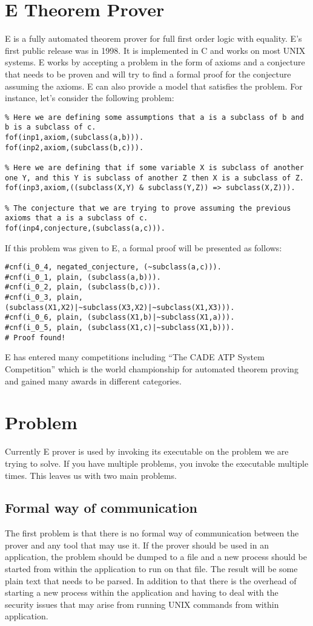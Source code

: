 \section{E Theorem Prover}
E is a fully automated theorem prover for full first order logic with equality. E's first public release was in 1998. It is implemented in C and works on most UNIX systems. E works by accepting a problem in the form of axioms and a conjecture that needs to be proven and will try to find a formal proof for the conjecture assuming the axioms. E can also provide a model that satisfies the problem. For instance, let's consider the following problem:
\begin{lstlisting}
% Here we are defining some assumptions that a is a subclass of b and b is a subclass of c.
fof(inp1,axiom,(subclass(a,b))).
fof(inp2,axiom,(subclass(b,c))).

% Here we are defining that if some variable X is subclass of another one Y, and this Y is subclass of another Z then X is a subclass of Z.
fof(inp3,axiom,((subclass(X,Y) & subclass(Y,Z)) => subclass(X,Z))).

% The conjecture that we are trying to prove assuming the previous axioms that a is a subclass of c.
fof(inp4,conjecture,(subclass(a,c))).
\end{lstlisting}
If this problem was given to E, a formal proof will be presented as follows:
\begin{lstlisting}
#cnf(i_0_4, negated_conjecture, (~subclass(a,c))).
#cnf(i_0_1, plain, (subclass(a,b))).
#cnf(i_0_2, plain, (subclass(b,c))).
#cnf(i_0_3, plain, (subclass(X1,X2)|~subclass(X3,X2)|~subclass(X1,X3))).
#cnf(i_0_6, plain, (subclass(X1,b)|~subclass(X1,a))).
#cnf(i_0_5, plain, (subclass(X1,c)|~subclass(X1,b))).
# Proof found!
\end{lstlisting}
E has entered many competitions including ``The CADE ATP System Competition'' which is the world championship for automated theorem proving and gained many awards in different categories.

\section{Problem}
Currently E prover is used by invoking its executable on the problem we are trying to solve. If you have multiple problems, you invoke the executable multiple times. This leaves us with two main problems.

\subsection{Formal way of communication}
The first problem is that there is no formal way of communication between the prover and any tool that may use it. If the prover should be used in an application, the problem should be dumped to a file and a new process should be started from within the application to run on that file. The result will be some plain text that needs to be parsed. In addition to that there is the overhead of starting a new process within the application and having to deal with the security issues that may arise from running UNIX commands from within application.

